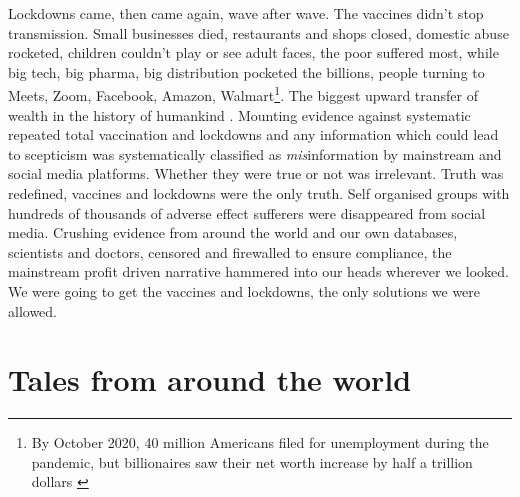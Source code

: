 \documentclass[11pt,a4paper,notitlepage]{report}
\begin{document}
Lockdowns came, then came again, wave after wave. The vaccines didn't stop transmission. Small businesses died, restaurants and shops closed, domestic abuse rocketed, children couldn't play or see adult faces, the poor suffered most, while big tech, big pharma, big distribution pocketed the billions, people turning to Meets, Zoom, Facebook, Amazon, Walmart\footnote{By October 2020, 40 million Americans filed for unemployment during the pandemic, but billionaires saw their net worth increase by half a trillion dollars \cite{businessinsider30102020}}. The biggest upward transfer of wealth in the history of humankind \cite{oxfam17012022}. Mounting evidence against systematic repeated total vaccination and lockdowns and any information which could lead to scepticism was systematically classified as \textit{mis}information by mainstream and social media platforms. Whether they were true or not was irrelevant. Truth was redefined, vaccines and lockdowns were the only truth. Self organised groups with hundreds of thousands of adverse effect sufferers were disappeared from social media. Crushing evidence from around the world and our own databases, scientists and doctors, censored and firewalled to ensure compliance, the mainstream profit driven narrative hammered into our heads wherever we looked. We were going to get the vaccines and lockdowns, the only solutions we were allowed.

\section*{Tales from around the world}
\end{document}
